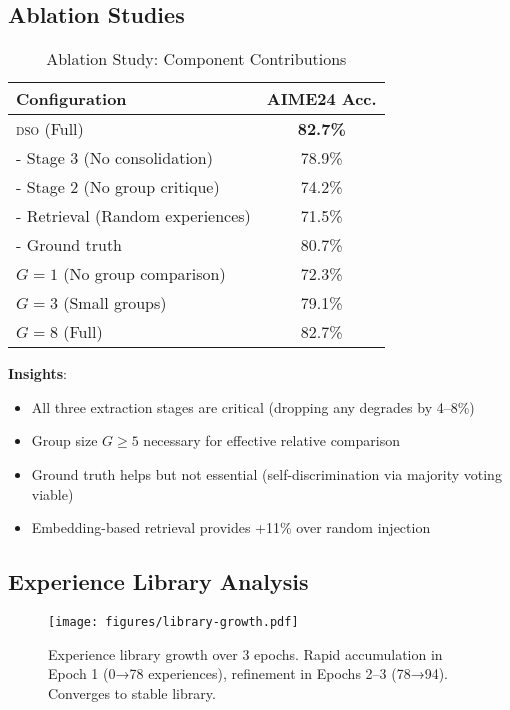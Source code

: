 \documentclass[11pt,letterpaper]{article}
\newcommand{\DSO}{\textsc{dso}}
\begin{document}
\subsection{Ablation Studies}

\begin{table}[t]
\centering
\caption{Ablation Study: Component Contributions}
\label{tab:ablation}
\begin{tabular}{lc}
\toprule
\textbf{Configuration} & \textbf{AIME24 Acc.} \\
\midrule
\DSO{} (Full) & \textbf{82.7\%} \\
\quad - Stage 3 (No consolidation) & 78.9\% \\
\quad - Stage 2 (No group critique) & 74.2\% \\
\quad - Retrieval (Random experiences) & 71.5\% \\
\quad - Ground truth & 80.7\% \\
$G=1$ (No group comparison) & 72.3\% \\
$G=3$ (Small groups) & 79.1\% \\
$G=8$ (Full) & 82.7\% \\
\bottomrule
\end{tabular}
\end{table}

\textbf{Insights}:
\begin{itemize}
    \item All three extraction stages are critical (dropping any degrades by 4--8\%)
    \item Group size $G \geq 5$ necessary for effective relative comparison
    \item Ground truth helps but not essential (self-discrimination via majority voting viable)
    \item Embedding-based retrieval provides +11\% over random injection
\end{itemize}

\subsection{Experience Library Analysis}

\begin{figure}[t]
\centering
\texttt{[image: figures/library-growth.pdf]}
\caption{Experience library growth over 3 epochs. Rapid accumulation in Epoch 1 (0→78 experiences), refinement in Epochs 2--3 (78→94). Converges to stable library.}
\label{fig:growth}
\end{figure}
\end{document}
